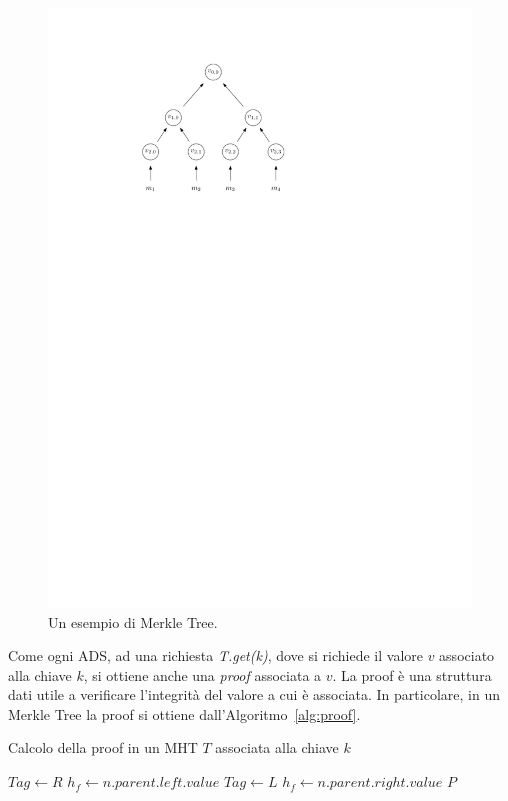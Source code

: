 \begin{figure}
	\centering
	\includegraphics{img/capuno/mht.pdf}
	\caption{Un esempio di Merkle Tree.}
	\label{fig:mht}
\end{figure}

Come ogni ADS, ad una richiesta \emph{T.get(k)}, dove si richiede il valore $v$ associato alla chiave $k$, si ottiene anche una \emph{proof} associata a $v$. La proof è una struttura dati utile a verificare l'integrità del valore a cui è associata. In particolare, in un Merkle Tree la proof si ottiene dall'Algoritmo~\ref{alg:proof}.

\begin{algorithm}
	\caption{Calcolo della proof in un MHT $T$ associata alla chiave $k$}
	\begin{algorithmic}
					
					\State $Tag \leftarrow R$
					\State $h_f \leftarrow n.parent.left.value$
				\Else										{}
					\State $Tag \leftarrow L$
					\State $h_f \leftarrow n.parent.right.value$
				\EndIf
			\EndWhile
			\Return $P$
		\EndProcedure
	\end{algorithmic}
	\label{alg:proof}
\end{algorithm}

